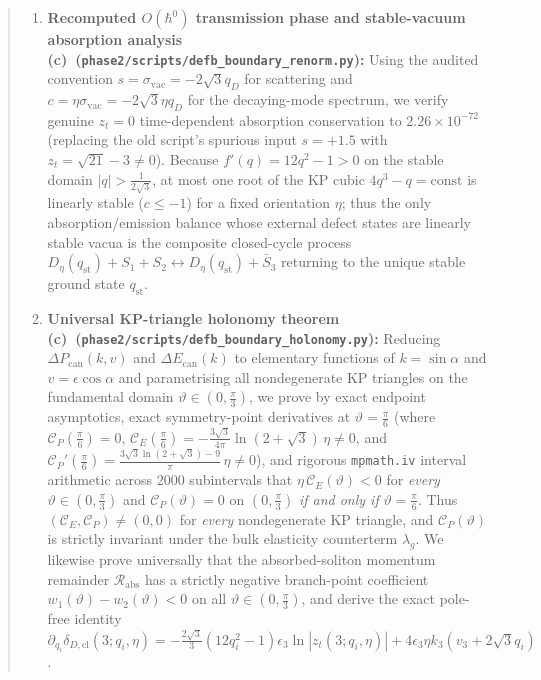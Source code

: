 \documentclass[11pt,a4paper]{article}
\theoremstyle{remark}
\newcommand{\hb}{\hbar}
\newcommand{\Lc}{\textbf{(c)}}
\newcommand{\sren}{\texttt{phase2/\allowbreak scripts/\allowbreak defb\_\allowbreak boundary\_\allowbreak renorm.py}}
\newcommand{\shol}{\texttt{phase2/\allowbreak scripts/\allowbreak defb\_\allowbreak boundary\_\allowbreak holonomy.py}}
\begin{document}
\begin{abstract}
\begin{enumerate}
Including the bulk vacuum-elasticity counterterm
$\Delta\mathcal{H}_{\mathrm{bulk}} = \hb\lambda_g u^2$ of
\texttt{phase2/onebody\_scheme.tex} shifts the directed triangle sum of
mode-sum soliton energies by
$2\lambda_g\eta(q_1-q_2)(q_2-q_3)(q_3-q_1) \ne 0$, uniquely selecting the
continuum zero-sound-shift scheme $\lambda_g = 0$ for mode-sum edge balance.
\item \textbf{Recomputed $O(\hb^0)$ transmission phase and stable-vacuum
absorption analysis \Lc\ (\sren):} Using the audited convention
$s = \sigma_{\mathrm{vac}} = -2\sqrt{3}q_D$ for scattering and
$c = \eta\sigma_{\mathrm{vac}} = -2\sqrt{3}\eta q_D$ for the decaying-mode
spectrum, we verify genuine $z_t=0$ time-dependent absorption conservation to
$2.26\times 10^{-72}$ (replacing the old script's spurious input $s=+1.5$ with
$z_t = \sqrt{21}-3 \ne 0$). Because $f'(q) = 12q^2-1 > 0$ on the stable domain
$|q| > \frac{1}{2\sqrt{3}}$, at most one root of the KP cubic
$4q^3-q = \mathrm{const}$ is linearly stable ($c \le -1$) for a fixed
orientation $\eta$; thus the only absorption/emission balance whose external
defect states are linearly stable vacua is the composite closed-cycle process
$D_\eta(q_{\mathrm{st}}) + S_1 + S_2 \leftrightarrow D_\eta(q_{\mathrm{st}}) + \bar{S}_3$
returning to the unique stable ground state $q_{\mathrm{st}}$.
\item \textbf{Universal KP-triangle holonomy theorem \Lc\ (\shol):}
Reducing $\Delta P_{\mathrm{can}}(k,v)$ and $\Delta E_{\mathrm{can}}(k)$ to
elementary functions of $k=\sin\alpha$ and $v=\epsilon\cos\alpha$ and
parametrising all nondegenerate KP triangles on the fundamental domain
$\vartheta \in (0,\frac{\pi}{3})$, we prove by exact endpoint asymptotics,
exact symmetry-point derivatives at $\vartheta=\frac{\pi}{6}$ (where
$\mathcal{C}_P(\frac{\pi}{6})=0$,
$\mathcal{C}_E(\frac{\pi}{6}) = -\frac{3\sqrt{3}}{4\pi}\ln(2+\sqrt{3})\,\eta \ne 0$,
and $\mathcal{C}_P'(\frac{\pi}{6}) = \frac{3\sqrt{3}\ln(2+\sqrt{3})-9}{\pi}\,\eta \ne 0$),
and rigorous \texttt{mpmath.iv} interval arithmetic across $2000$ subintervals
that $\eta\,\mathcal{C}_E(\vartheta) < 0$ for \emph{every}
$\vartheta \in (0,\frac{\pi}{3})$ and $\mathcal{C}_P(\vartheta) = 0$ on
$(0,\frac{\pi}{3})$ \emph{if and only if} $\vartheta = \frac{\pi}{6}$. Thus
$(\mathcal{C}_E,\mathcal{C}_P) \ne (0,0)$ for \emph{every} nondegenerate KP
triangle, and $\mathcal{C}_P(\vartheta)$ is strictly invariant under the bulk
elasticity counterterm $\lambda_g$. We likewise prove universally that the
absorbed-soliton momentum remainder $\mathcal{R}_{\mathrm{abs}}$ has a
strictly negative branch-point coefficient $w_1(\vartheta)-w_2(\vartheta) < 0$
on all $\vartheta \in (0,\frac{\pi}{3})$, and derive the exact pole-free
identity
$\partial_{q_i}\delta_{D,\mathrm{cl}}(3;q_i,\eta) = -\frac{2\sqrt{3}}{3}(12q_i^2-1)\epsilon_3\ln|z_t(3;q_i,\eta)| + 4\epsilon_3\eta k_3(v_3+2\sqrt{3}q_i)$.
\end{enumerate}
\end{abstract}
\end{document}
